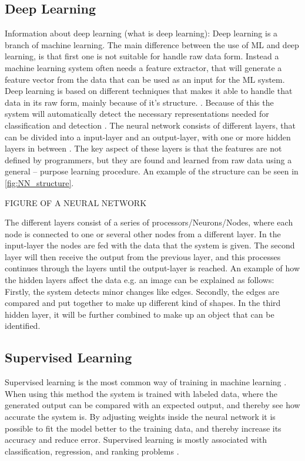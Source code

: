 \subsection{Deep Learning}

Information about deep learning (what is deep learning):
Deep learning is a branch of machine learning. The main difference between the use of ML and deep learning, is that first one is not suitable for handle raw data form. Instead a machine learning system often needs a feature extractor, that will generate a feature vector from the data that can be used as an input for the ML system. \citep{LeCun2015}
Deep learning is based on different techniques that makes it able to handle that data in its raw form, mainly because of it’s structure. \citep{LeCun2015, Schmidhuber2015}. Because of this the system will automatically detect the necessary representations needed for classification and detection \citep{LeCun2015}. The neural network consists of different layers, that can be divided into a input-layer and an output-layer, with one or more hidden layers in between \citep{LeCun2015, Schmidhuber2015}. The key aspect of these layers is that the features are not defined by programmers, but they are found and learned from raw data using a general – purpose learning procedure. \citep{LeCun2015} An example of the structure can be seen in \autoref{fig:NN_structure}.   
 
FIGURE OF A NEURAL NETWORK \label{fig:NN_structure}

The different layers consist of a series of processors/Neurons/Nodes, where each node is connected to one or several other nodes from a different layer. In the input-layer the nodes are fed with the data that the system is given. The second layer will then receive the output from the previous layer, and this processes continues through the layers until the output-layer is reached. \citep{Schmidhuber2015} An example of how the hidden layers affect the data e.g. an image can be explained as follows:  
Firstly, the system detects minor changes like edges. Secondly, the edges are compared and put together to make up different kind of shapes. In the third hidden layer, it will be further combined to make up an object that can be identified. \citep{LeCun2015}

\subsection{Supervised Learning}
Supervised learning is the most common way of training in machine learning \citep{LeCun2015}. When using this method the system is trained with labeled data, where the generated output can be compared with an expected output, and thereby see how accurate the system is. By adjusting weights inside the neural network it is possible to fit the model better to the training data, and thereby increase its accuracy and reduce error. \citep{LeCun2015} Supervised learning is mostly associated with classification, regression, and ranking problems \citep{Mehryar2012}.

